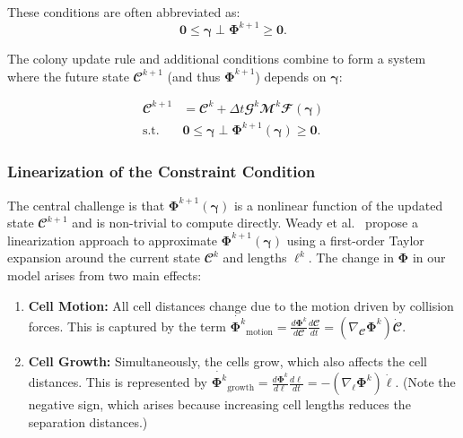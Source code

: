 \documentclass[conference]{IEEEtran}
\begin{document}
These conditions are often abbreviated as:
\begin{equation}
    \mathbf{0} \leq \boldsymbol{\gamma} \perp \mathbf{\Phi}^{k+1} \geq \mathbf{0}.
\end{equation}


The colony update rule and additional conditions combine to form a system where the future state $\mathbfcal{C}^{k+1}$ (and thus $\mathbf{\Phi}^{k+1}$) depends on $\boldsymbol{\gamma}$:

\begin{equation} \label{eq:colony_update_with_constraints}
    \begin{split}
        \mathbfcal{C}^{k+1} & = \mathbfcal{C}^k + \Delta t \mathbfcal{G}^k \mathbfcal{M}^k \mathbfcal{F}(\boldsymbol{\gamma}) \\
        \text{s.t.} \quad & \mathbf{0} \leq \boldsymbol{\gamma} \perp \mathbf{\Phi}^{k+1}(\boldsymbol{\gamma}) \geq \mathbf{0}.
    \end{split}
\end{equation}

\subsubsection{Linearization of the Constraint Condition}



The central challenge is that $\mathbf{\Phi}^{k+1}(\boldsymbol{\gamma})$ is a nonlinear function of the updated state $\mathbfcal{C}^{k+1}$ and is non-trivial to compute directly. Weady et al.~\cite{Weady2024SM} propose a linearization approach to approximate $\mathbf{\Phi}^{k+1}(\boldsymbol{\gamma})$ using a first-order Taylor expansion around the current state $\mathbfcal{C}^k$ and lengths $\boldsymbol{\ell}^k$. The change in $\mathbf{\Phi}$ in our model arises from two main effects:

\begin{enumerate}
    \item \textbf{Cell Motion:} All cell distances change due to the motion driven by collision forces. This is captured by the term $\dot{\mathbf{\Phi}^k}_{\text{motion}} = \frac{d \mathbf{\Phi}^k}{d \mathbfcal{C}} \frac{d \mathbfcal{C}}{dt} = (\nabla_{\mathbfcal{C}} \mathbf{\Phi}^k) \dot{\mathbfcal{C}}$.
    \item \textbf{Cell Growth:} Simultaneously, the cells grow, which also affects the cell distances. This is represented by $\dot{\mathbf{\Phi}^k}_{\text{growth}} = \frac{d \mathbf{\Phi}^k}{d \boldsymbol{\ell}} \frac{d \boldsymbol{\ell}}{dt} =-(\nabla_{\boldsymbol{\ell}} \mathbf{\Phi}^k) \dot{\boldsymbol{\ell}}$. (Note the negative sign, which arises because increasing cell lengths reduces the separation distances.)
\end{enumerate}
\end{document}
